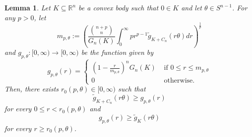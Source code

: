 \documentclass[10pt]{amsart}
\newtheorem{lemma}[thm]{Lemma}
\def\R{\mathbb{R}}
\numberwithin{equation}{section}
\begin{document}
\begin{lemma}\label{lem:r_0}
Let $K\subseteq\R^n$ be a convex body such that $0\in K$ and let $\theta\in S^{n-1}$. For any $p>0$, let
$$
m_{p,\theta}:=\left(\frac{{{n+p}\choose{n}}}{G_n(K)}\int_0^\infty pr^{p-1}\tilde{g}_{K+C_n}(r\theta)dr\right)^\frac{1}{p}
$$
and $g_{p,\theta}:[0,\infty)\to[0,\infty)$ be the function given by
$$
g_{p,\theta}(r)=\begin{cases}
\left(1-\frac{r}{m_{p,\theta}}\right)^nG_n(K)&\textrm{ if }0\leq r\leq m_{p,\theta}\\
0 &\textrm{ otherwise}.
\end{cases}
$$
Then, there exists $r_0(p,\theta)\in[0,\infty)$ such that
$$
\tilde{g}_{K+C_n}(r\theta)\geq g_{p,\theta}(r)
$$
for every $0\leq r<r_0(p,\theta)$ and
$$
g_{p,\theta}(r)\geq \tilde{g}_K(r\theta)
$$
for every $r\geq r_0(p,\theta)$.
\end{lemma}
\end{document}
